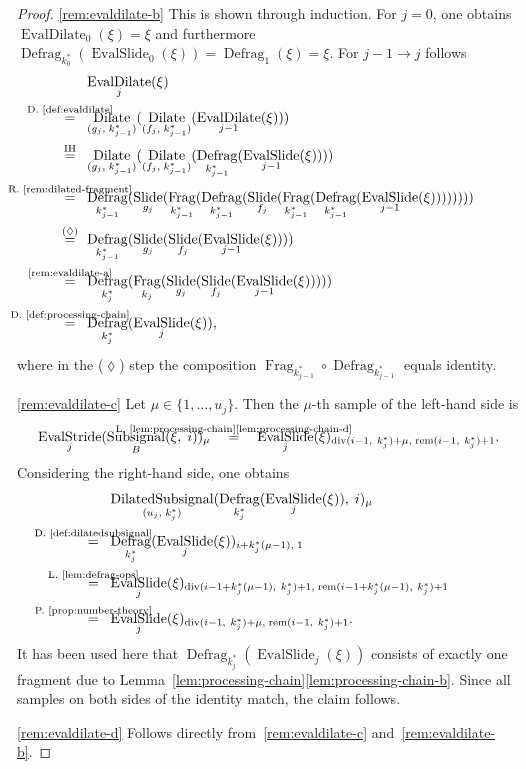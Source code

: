 \documentclass[journal]{IEEEtran}
\newcommand{\ROI}{B}
\newcommand{\discint}[2]{\{#1,\dotsc,#2\}}
\newcommand{\inint}[2]{\in\discint{#1}{#2}}
\DeclareMathOperator{\Subsignal}{Subsignal}
\DeclareMathOperator{\Slide}{Slide}
\DeclareMathOperator{\Fragmentation}{Frag}
\DeclareMathOperator{\Defragmentation}{Defrag}
\DeclareMathOperator{\EvalStride}{EvalStride}
\DeclareMathOperator{\EvalSlide}{EvalSlide}
\renewcommand{\div}[2]{\operatorname{div}(#1,\ #2)}
\newcommand{\rem}[2]{\operatorname{rem}(#1,\ #2)}
\newcommand{\equsing}[1]{\overset{\mathclap{\text{#1}}}{=}}
\DeclareMathOperator{\DilatedSubsignal}{DilatedSubsignal}
\DeclareMathOperator{\Dilate}{Dilate}
\DeclareMathOperator{\EvalDilate}{EvalDilate}
\begin{document}
\begin{proof}
\ref{rem:evaldilate-b}
This is shown through induction.
For $j = 0$, one obtains $\EvalDilate_0(\xi) = \xi$ and furthermore $\Defragmentation_{k_0^*}(\EvalSlide_0(\xi)) = \Defragmentation_{1}(\xi) = \xi$.
For $j - 1 \to j$ follows
\begin{align*}
  & \EvalDilate_j(\xi)\\
  \equsing{D.~\ref{def:evaldilate}}\ \ & \Dilate_{(g_j,\; k_{j - 1}^*)}( \Dilate_{(f_j,\; k_{j - 1}^*)}( \EvalDilate_{j - 1}(\xi) ) )\\
  \equsing{IH}\ \ & \Dilate_{(g_j,\; k_{j - 1}^*)}( \Dilate_{(f_j,\; k_{j - 1}^*)}(\Defragmentation_{k_{j - 1}^*}(\EvalSlide_{j - 1}(\xi))))\\
  \equsing{R.~\ref{rem:dilated-fragment}}\ \ & \Defragmentation_{k_{j - 1}^*}( \Slide_{g_j}( \Fragmentation_{k_{j - 1}^*}( \Defragmentation_{k_{j - 1}^*}( \Slide_{f_j}( \Fragmentation_{k_{j - 1}^*}( \Defragmentation_{k_{j - 1}^*}( \EvalSlide_{j - 1}(\xi) ) ) ) ) ) ) )\\
  \equsing{($\lozenge$)}\ \ & \Defragmentation_{k_{j - 1}^*}( \Slide_{g_j}( \Slide_{f_j}( \EvalSlide_{j - 1}(\xi) ) ) )\\
  \equsing{\ref{rem:evaldilate-a}}\ \ & \Defragmentation_{k_j^*}( \Fragmentation_{k_j}( \Slide_{g_j}( \Slide_{f_j}( \EvalSlide_{j - 1}(\xi) ) ) ) )\\
  \equsing{D.~\ref{def:processing-chain}}\ \ & \Defragmentation_{k_j^*}( \EvalSlide_j(\xi) )\text{,}
\end{align*}
where in the ($\lozenge$) step the composition $\Fragmentation_{k_{j - 1}^*} \circ \Defragmentation_{k_{j - 1}^*}$ equals identity.

\ref{rem:evaldilate-c}
Let $\mu\inint{1}{u_j}$.
Then the $\mu$-th sample of the left-hand side is
\begin{displaymath}
  \EvalStride_j(\Subsignal_\ROI(\xi,\; i))_\mu
  \ \ \ \equsing{L.~\ref{lem:processing-chain}\ref{lem:processing-chain-d}}\ \ \ \EvalSlide_j(\xi)_{\div{i - 1}{k_j^*} + \mu,\;\rem{i - 1}{k_j^*} + 1}\text{.}
\end{displaymath}
Considering the right-hand side, one obtains
\begin{align*}
  & \DilatedSubsignal_{(u_j,\; k_j^*)}(\Defragmentation_{k_j^*}(\EvalSlide_j(\xi)),\; i)_\mu\\
  \equsing{D.~\ref{def:dilatedsubsignal}}\ \ & \Defragmentation_{k_j^*}(\EvalSlide_j(\xi))_{i + k_j^*(\mu - 1),\; 1}\\
  \equsing{L.~\ref{lem:defrag-ops}}\ \ & \EvalSlide_j(\xi)_{\div{i - 1 + k_j^*(\mu - 1)}{k_j^*} + 1,\;\rem{i - 1 + k_j^*(\mu - 1)}{k_j^*} + 1}\\
  \equsing{P.~\ref{prop:number-theory}}\ \ & \EvalSlide_j(\xi)_{\div{i - 1}{k_j^*} + \mu,\;\rem{i - 1}{k_j^*} + 1}\text{.}
\end{align*}
It has been used here that $\Defragmentation_{k_j^*}(\EvalSlide_j(\xi))$ consists of exactly one fragment due to Lemma~\ref{lem:processing-chain}\ref{lem:processing-chain-b}.
Since all samples on both sides of the identity match, the claim follows.

\ref{rem:evaldilate-d}
Follows directly from~\ref{rem:evaldilate-c} and~\ref{rem:evaldilate-b}.
\end{proof}
\end{document}
